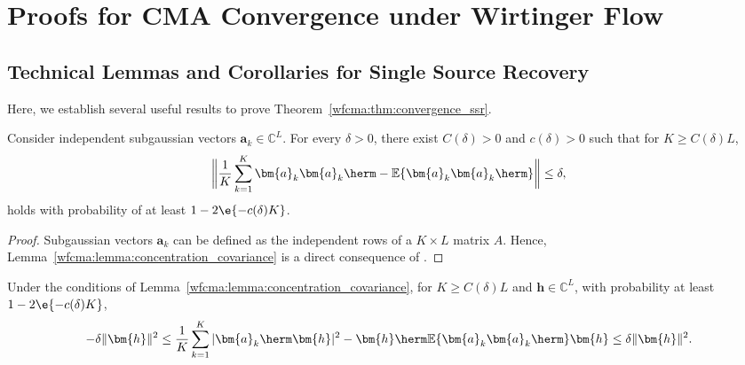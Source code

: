 \chapter{Proofs for CMA Convergence under Wirtinger Flow}

\section{Technical Lemmas and Corollaries for Single Source Recovery} \label{appdx:wfcma_ssr}
Here, we establish several useful results to prove Theorem~\ref{wfcma:thm:convergence_ssr}.  
\begin{lem}
	\label{wfcma:lemma:concentration_covariance}
	Consider independent subgaussian vectors $\bm{a}_k\in\mathbb{C}^L$. For every $\delta>0$, there exist $C(\delta)>0$ and $c(\delta)>0$ such that for $K\geq C(\delta)L$,
	\begin{equation}
		\bigg\|\frac{1}{K}\sum_{k=1}^K\bm{a}_k\bm{a}_k\herm-\mathbb{E}\{\bm{a}_k\bm{a}_k\herm\}\bigg\| \leq \delta,\nonumber%
	\end{equation}
	holds with probability of at least $1-2\e{-c(\delta) K}$.
\end{lem}
\begin{proof} Subgaussian vectors $\bm{a}_k$ can be defined as the independent rows of a $K\times L$ matrix $A$. Hence, Lemma~\ref{wfcma:lemma:concentration_covariance} is a direct consequence of \cite[Theorem 5.39]{Vershynin2012nonasymptoticmatrices}.
\end{proof}	

\begin{cor} \label{wfcma:cor:abs_s}	 
	Under the conditions of Lemma~\ref{wfcma:lemma:concentration_covariance}, for $K\geq C(\delta)L$ and $\bm{h}\in\mathbb{C}^L$, with probability at least $1-2\e{-c(\delta) K}$,
	\begin{equation}
		-\delta\|\bm{h}\|^2\leq \frac{1}{K}\sum_{k=1}^K|\bm{a}_k\herm\bm{h}|^2- \bm{h}\herm\mathbb{E}\{\bm{a}_k\bm{a}_k\herm\}\bm{h}\leq\delta\|\bm{h}\|^2. \nonumber%
	\end{equation}
\end{cor}

